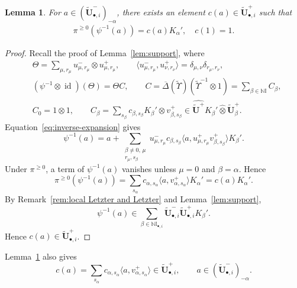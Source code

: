 \documentclass[a4paper,reqno,12pt]{amsart}
\numberwithin{equation}{section}
\newtheorem{lemma}[proposition]{Lemma}
\theoremstyle{definition}
\theoremstyle{plain}
\theoremstyle{definition}
\def\N{\mathbb N}
\def\I{\mathbb I}
\def\bIi{\I_{\bullet,i}}
\def\tU{\widetilde{\mathbf U}}
\def \tbiU{\tU_{\bullet,i}}
\def\tfX{\widetilde\Upsilon}
\newcommand{\id}{\operatorname{id}}
\newcommand{\bDelta}{\overline\Delta}
\begin{document}
\begin{lemma}\label{lem:c-definition2}
 For $a\in(\tbiU^-)_{-\alpha}$, there exists an element $c(a)\in\tbiU^+$ such that
 \begin{align}
     \pi^{\ge0}(\psi^{-1}(a))=c(a)K_{\alpha}',\quad c(1)=1.\label{eq:c-definition2}
 \end{align}
\end{lemma}
\begin{proof}
    Recall the proof of Lemma~\ref{lem:support}, where
    \begin{align*}
      &\Theta=\sum_{\mu,r_\mu}u^-_{\mu,r_\mu}\otimes u^+_{\mu,r_\mu},
\qquad\langle u^-_{\mu,r_\mu},u^+_{\nu,r_\nu}\rangle=\delta_{\mu,\nu}\delta_{r_\mu ,r_\nu},\\
&(\psi^{-1}\otimes\id)(\Theta)=\Theta C,\qquad
C=\bDelta(\tfX)(\tfX^{-1}\otimes1)=\sum_{\beta\in\N\I}C_\beta,\\
&C_0=1\otimes 1,\qquad C_\beta=\sum_{s_\beta} c_{\beta,s_\beta}K_\beta'\otimes v^+_{\beta,s_\beta}\in\widehat{\tU^+}K_\beta'
\widehat\otimes\tU^+_\beta.
    \end{align*}
    Equation~\eqref{eq:inverse-expansion} gives
    \begin{equation*}
        \psi^{-1}(a)=a+\sum_{\substack{\beta\ne0,\,\mu\\r_\mu,s_\beta}}
u^-_{\mu,r_\mu}c_{\beta,s_\beta}
\langle a,u^+_{\mu,r_\mu}v^+_{\beta,s_\beta}\rangle K_\beta'.
    \end{equation*}
    Under $\pi^{\ge0}$, a term of $\psi^{-1}(a)$ vanishes unless $\mu=0$ and $\beta=\alpha$. Hence
    \begin{equation*}
     \pi^{\ge0}(\psi^{-1}(a))=\sum_{s_{\alpha}}c_{\alpha,s_\alpha}
\langle a,v^+_{\alpha,s_\alpha}\rangle K_\alpha'=c(a)K_{\alpha}'.   
    \end{equation*}
By Remark~\ref{rem:local Letzter and Letzter} and Lemma~\ref{lem:support}, 
\begin{equation*}
    \psi^{-1}(a)\in\sum_{\beta\in\N\bIi}\tbiU^-\tbiU^+K_\beta'.
\end{equation*}
Hence $c(a)\in\tbiU^+$.
\end{proof}

Lemma~\ref{lem:c-definition2} also gives
\begin{equation}\label{eq:c-def of a}
    c(a)=\sum_{s_{\alpha}}c_{\alpha,s_\alpha}
\langle a,v^+_{\alpha,s_\alpha}\rangle\in\tbiU^+,\qquad a\in(\tbiU^-)_{-\alpha}.
\end{equation}
\end{document}
